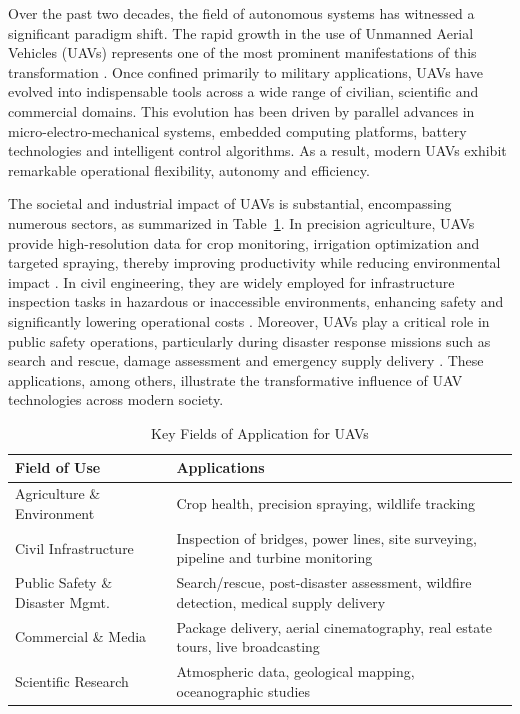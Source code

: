 Over the past two decades, the field of autonomous systems has witnessed a significant paradigm shift. The rapid growth in the use of Unmanned Aerial Vehicles (UAVs) represents one of the most prominent manifestations of this transformation \cite{UAV_rev,UAV_rev1}. Once confined primarily to military applications, UAVs have evolved into indispensable tools across a wide range of civilian, scientific and commercial domains. This evolution has been driven by parallel advances in micro-electro-mechanical systems, embedded computing platforms, battery technologies and intelligent control algorithms. As a result, modern UAVs exhibit remarkable operational flexibility, autonomy and efficiency.

The societal and industrial impact of UAVs is substantial, encompassing numerous sectors, as summarized in Table~\ref{tab:uav_applications}. In precision agriculture, UAVs provide high-resolution data for crop monitoring, irrigation optimization and targeted spraying, thereby improving productivity while reducing environmental impact \cite{agrcltr1,agrcltr2,agrcltr3}. In civil engineering, they are widely employed for infrastructure inspection tasks in hazardous or inaccessible environments, enhancing safety and significantly lowering operational costs \cite{UAVs_civil_eng1,UAVs_civil_eng2,UAVs_civil_eng3}. Moreover, UAVs play a critical role in public safety operations, particularly during disaster response missions such as search and rescue, damage assessment and emergency supply delivery \cite{Emergency_response1,Emergency_response2}. These applications, among others, illustrate the transformative influence of UAV technologies across modern society.


\begin{table}
\centering
\caption{Key Fields of Application for UAVs}
\label{tab:uav_applications}
\renewcommand{\arraystretch}{1.05} %
\setlength{\tabcolsep}{6pt} %
\begin{tabular}{|p{}|p{}|}
\hline
\textbf{Field of Use} & \textbf{Applications} \\
\hline
Agriculture \& Environment & 
Crop health, precision spraying, wildlife tracking \\
\hline
Civil Infrastructure & 
Inspection of bridges, power lines, site surveying, pipeline and turbine monitoring \\
\hline
Public Safety \& Disaster Mgmt. & 
Search/rescue, post-disaster assessment, wildfire detection, medical supply delivery \\
\hline
Commercial \& Media & 
Package delivery, aerial cinematography, real estate tours, live broadcasting \\
\hline
Scientific Research & 
Atmospheric data, geological mapping, oceanographic studies \\
\hline
\end{tabular}
\end{table}


